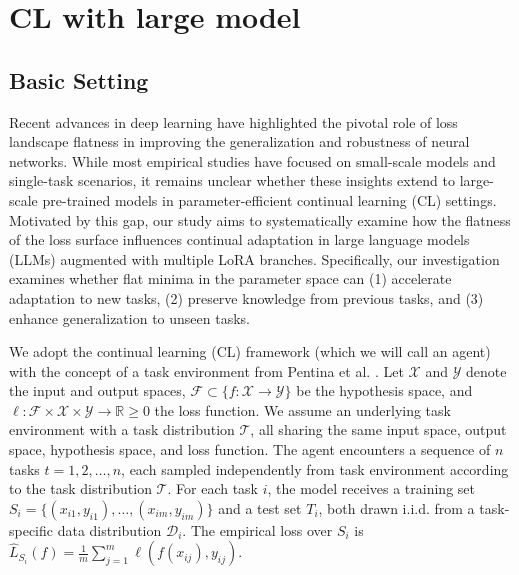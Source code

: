 \documentclass[letterpaper]{article} %
\begin{document}
\section{CL with large model}

\subsection{Basic Setting}
Recent advances in deep learning have highlighted the pivotal role of loss landscape flatness in improving the generalization and robustness of neural networks. While most empirical studies have focused on small-scale models and single-task scenarios, it remains unclear whether these insights extend to large-scale pre-trained models in parameter-efficient continual learning (CL) settings. Motivated by this gap, our study aims to systematically examine how the flatness of the loss surface influences continual adaptation in large language models (LLMs) augmented with multiple LoRA branches. Specifically,  our investigation examines whether flat minima in the parameter space can (1) accelerate adaptation to new tasks, (2) preserve knowledge from previous tasks, and (3) enhance generalization to unseen tasks.


We adopt the continual learning (CL) framework (which we will call an agent) with the concept of a task environment from Pentina et al. . Let $\mathcal{X}$ and $\mathcal{Y}$ denote the input and output spaces, $\mathcal{F} \subset \{f : \mathcal{X} \to \mathcal{Y}\}$ be the hypothesis space, and $\ell: \mathcal{F} \times \mathcal{X} \times \mathcal{Y} \to \mathbb{R}{\geq 0}$ the loss function. We assume an underlying task environment with a task distribution $\mathcal{T}$, all sharing the same input space, output space, hypothesis space, and loss function. The agent encounters a sequence of $n$ tasks ${t=1, 2, \ldots, n}$, each sampled independently from task environment according to the task distribution $\mathcal{T}$. For each task $i$, the model receives a training set $S_i = \{(x_{i1}, y_{i1}), \ldots, (x_{im}, y_{im})\}$ and a test set $T_i$, both drawn i.i.d. from a task-specific data distribution $\mathcal{D}_i$. The empirical loss over
$S_i$ is $\hat{L}_{S_i}(f) = \frac{1}{m}\sum_{j=1}^{m} \ell(f(x_{ij}), y_{ij})$.
\end{document}
